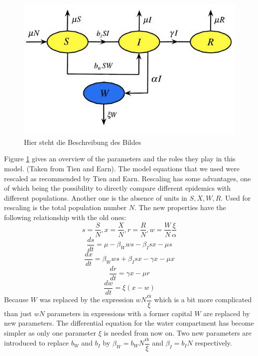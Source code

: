 \documentclass[11pt]{article}
\begin{document}
\begin{center}
\begin{figure}[htb]
\centerline{\includegraphics[scale=0.5]{Bilder/flow_diagramm_siwr_copia.png}}
\caption{Hier steht die Beschreibung des Bildes}
\label{pic:flowdiagram}
\end{figure}
\end{center}
Figure \ref{pic:flowdiagram} gives an overview of the parameters and the roles they play in this model. (Taken from Tien and Earn).
The model equations that we used were rescaled as recommended by Tien and Earn. Rescaling has some advantages, one of which being the possibility to directly compare different epidemics with different populations. Another one is the absence of units in $ S, X, W, R $. Used for rescaling is the total population number $ N $. The new properties have the following relationship with the old ones: 
\begin{equation*}
s=\dfrac{S}{N} ,	  x=\dfrac{X}{N} ,	  r=\dfrac{R}{N} ,     w=\dfrac{W}{N}\dfrac{\xi}{\alpha} 
\end{equation*}
\begin{equation*}
\dfrac{ds}{dt}=\mu -\beta_{W}ws-\beta_{I}sx-\mu s
\end{equation*}
\begin{equation*}
\dfrac{dx}{dt}=\beta_{W}ws+\beta_{I}sx-\gamma x-\mu x
\end{equation*}
\begin{equation*}
\dfrac{dr}{dt}=\gamma x-\mu r
\end{equation*}
\begin{equation*}
\dfrac{dw}{dt}=\xi (x-w) 
\end{equation*}
Because $ W $ was replaced by the expression $ wN\dfrac{\alpha}{\xi} $ which is a bit more complicated than just $ wN $ parameters in expressions with a former capital $ W $ are replaced by new parameters. The differential equation for the water compartment has become simpler as only one parameter $ \xi $ is needed from now on. Two new parameters are introduced to replace $ b_{W} $ and $ b_{I} $ by $ \beta_{W}=b_{W}N\dfrac{\alpha}{\xi} $ and $ \beta_{I}=b_{I}N $ respectively.
\end{document}
